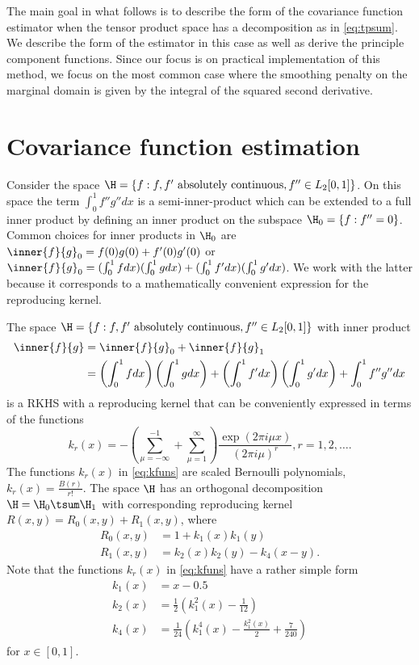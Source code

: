 The main goal in what follows is to describe the form of the covariance function estimator when the tensor product space has a decomposition as in \eqref{eq:tpsum}. We describe the form of the estimator in this case as well as derive the principle component functions. Since our focus is on practical implementation of this method, we focus on the most common case where the smoothing penalty on the marginal domain is given by the integral of the squared second derivative.

\section{Covariance function estimation} 

\label{sec:covariance_function_estimation}

Consider the space $\H = \{f : f, f' \mbox{ absolutely continuous}, f'' \in L_2[0,1]\}$. On this space the term $\int_0^1 f''g''dx$ is a semi-inner-product which can be extended to a full inner product by defining an inner product on the subspace $\H_0 = \{f : f'' = 0\}$. Common choices for inner products in $\H_0$ are $\inner{f}{g}_0 = f(0)g(0) + f'(0)g'(0)$ or $\inner{f}{g}_0 = (\int_0^1fdx)(\int_0^1gdx) + (\int_0^1f'dx)(\int_0^1g'dx)$. We work with the latter because it corresponds to a mathematically convenient expression for the reproducing kernel. 

The space $\H = \{f : f, f' \mbox{ absolutely continuous}, f'' \in L_2[0,1]\}$ with inner product 
\begin{align*}
	\inner{f}{g} &= \inner{f}{g}_0 + \inner{f}{g}_1 \\
	&= \left(\int_0^1fdx\right)\left(\int_0^1gdx\right) + \left(\int_0^1f'dx\right)\left(\int_0^1g'dx\right) + \int_0^1 f''g''dx 
\end{align*}
is a RKHS with a reproducing kernel that can be conveniently expressed in terms of the functions 
\begin{equation}
	k_r(x) = -\left( \sum_{\mu = -\infty}^{-1} + \sum_{\mu=1}^{\infty} \right) \frac{\exp(2\pi i \mu x)}{(2 \pi i \mu)^r}, r = 1,2, \dots. \label{eq:kfuns} 
\end{equation}
The functions $k_r(x)$ in \eqref{eq:kfuns} are scaled Bernoulli polynomials, $k_r(x) = \frac{B(r)}{r!}$. The space $\H$ has an orthogonal decomposition $\H = \H_0 \tsum \H_1$ with corresponding reproducing kernel $R(x,y) = R_0(x,y) + R_1(x,y)$, where 
\begin{align}
	R_0(x,y) &= 1 + k_1(x)k_1(y) \\
	R_1(x,y) &= k_2(x)k_2(y) - k_4(x-y). 
\end{align}
Note that the functions $k_r(x)$ in \eqref{eq:kfuns} have a rather simple form 
\begin{align*}
	k_1(x) &= x - 0.5\\
	k_2(x) &= \frac{1}{2}(k_1^2(x) - \frac{1}{12}) \\
	k_4(x) &= \frac{1}{24} \left(k_1^4(x) - \frac{k_1^2(x)}{2} + \frac{7}{240} \right) 
\end{align*}
for $x \in [0,1]$. 

